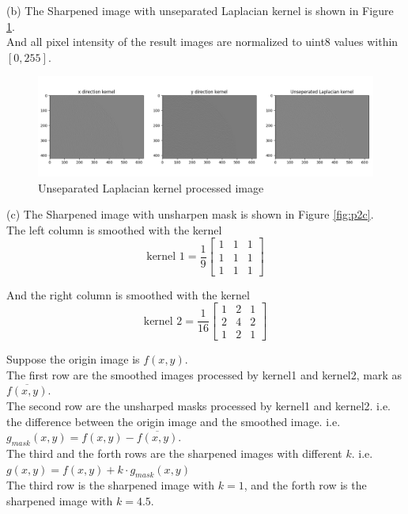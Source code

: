 (b) The Sharpened image with unseparated Laplacian kernel is shown in Figure \ref{fig:p2b}.\\
And all pixel intensity of the result images are normalized to uint8 values within $[0,255]$.\\

\begin{figure}[htbp]
    \centering
	\includegraphics[width=\textwidth]{../images/p2/p2b.png}
    \caption{Unseparated Laplacian kernel processed image}
\label{fig:p2b}
\end{figure}

(c) The Sharpened image with unsharpen mask is shown in Figure \ref{fig:p2c}.\\
The left column is smoothed with the kernel 
$$\text{kernel\ 1}=\dfrac{1}{9}\begin{bmatrix}1 & 1 & 1\\1 & 1 & 1\\1 & 1 & 1\end{bmatrix}$$

And the right column is smoothed with the kernel
$$\text{kernel\ 2}=\dfrac{1}{16}\begin{bmatrix}1 & 2 & 1\\2 & 4 & 2\\1 & 2 & 1\end{bmatrix}$$

Suppose the origin image is $f(x,y)$.\\
The first row are the smoothed images processed by kernel1 and kernel2, mark as $\overline{f(x,y)}$.\\
The second row are the unsharped masks processed by kernel1 and kernel2. i.e. the difference between the
origin image and the smoothed image. i.e. $g_{mask}(x,y)=f(x,y)-\overline{f(x,y)}$.\\
The third and the forth rows are the sharpened images with different $k$. i.e. $g(x,y)=f(x,y)+k\cdot g_{mask}(x,y)$\\
The third row is the sharpened image with $k=1$, and the forth row is the sharpened image with $k=4.5$.\\


